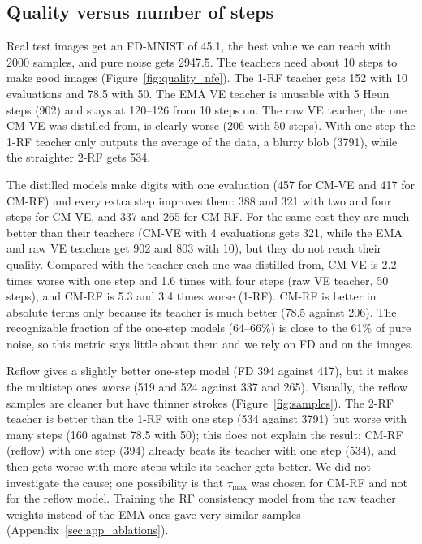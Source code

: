 \documentclass{article}
\begin{document}
\subsection{Quality versus number of steps}

Real test images get an FD-MNIST of 45.1, the best value we can reach with 2000
samples, and pure noise gets 2947.5. The teachers need about 10 steps to make
good images (Figure~\ref{fig:quality_nfe}). The 1-RF teacher gets 152 with 10
evaluations and 78.5 with 50. The EMA VE teacher is unusable with 5 Heun steps
(902) and stays at 120--126 from 10 steps on. The raw VE teacher, the one CM-VE
was distilled from, is clearly worse (206 with 50 steps). With one step the 1-RF
teacher only outputs the average of the data, a blurry blob (3791), while the
straighter 2-RF gets 534.

The distilled models make digits with one evaluation (457 for CM-VE and 417 for
CM-RF) and every extra step improves them: 388 and 321 with two and four steps
for CM-VE, and 337 and 265 for CM-RF. For the same cost they are much better than
their teachers (CM-VE with 4 evaluations gets 321, while the EMA and raw VE
teachers get 902 and 803 with 10), but they do not reach their quality. Compared
with the teacher each one was distilled from, CM-VE is 2.2 times worse with one
step and 1.6 times with four steps (raw VE teacher, 50 steps), and CM-RF is 5.3
and 3.4 times worse (1-RF). CM-RF is better in absolute terms only because its
teacher is much better (78.5 against 206). The recognizable fraction of the
one-step models (64--66\%) is close to the 61\% of pure noise, so this metric
says little about them and we rely on FD and on the images.

Reflow gives a slightly better one-step model (FD 394 against 417), but it makes
the multistep ones \emph{worse} (519 and 524 against 337 and 265). Visually, the
reflow samples are cleaner but have thinner strokes (Figure~\ref{fig:samples}).
The 2-RF teacher is better than the 1-RF with one step (534 against 3791) but
worse with many steps (160 against 78.5 with 50); this does not explain the
result: CM-RF (reflow) with one step (394) already beats its teacher with one
step (534), and then gets worse with more steps while its teacher gets better. We
did not investigate the cause; one possibility is that $\tau_\text{max}$ was
chosen for CM-RF and not for the reflow model. Training the RF consistency model
from the raw teacher weights instead of the EMA ones gave very similar samples
(Appendix~\ref{sec:app_ablations}).
\end{document}
